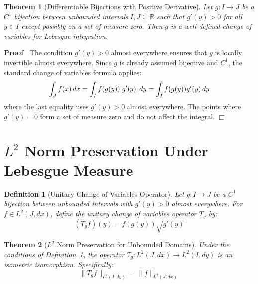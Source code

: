 \documentclass{article}
\newenvironment{proof}{\noindent\textbf{Proof\ }}{\hspace*{\fill}$\Box$\medskip}
\newtheorem{definition}{Definition}
\newtheorem{theorem}{Theorem}
\begin{document}
\begin{theorem}[Differentiable Bijections with Positive Derivative]
  \label{thm:diff_bijective}Let $g : I \to J$ be a $C^1$ bijection between
  unbounded intervals $I, J \subseteq \mathbb{R}$ such that $g' (y) > 0$ for
  all $y \in I$ except possibly on a set of measure zero. Then $g$ is a
  well-defined change of variables for Lebesgue integration.
\end{theorem}

\begin{proof}
  The condition $g' (y) > 0$ almost everywhere ensures that $g$ is locally
  invertible almost everywhere. Since $g$ is already assumed bijective and
  $C^1$, the standard change of variables formula applies:
  \begin{equation}
    \label{eq:change_vars} \int_J f (x)  \hspace{0.17em} dx = \int_I f (g (y))
    |g' (y) |  \hspace{0.17em} dy = \int_I f (g (y)) g' (y)  \hspace{0.17em}
    dy
  \end{equation}
  where the last equality uses $g' (y) > 0$ almost everywhere. The points
  where $g' (y) = 0$ form a set of measure zero and do not affect the
  integral.
\end{proof}

\section{$L^2$ Norm Preservation Under Lebesgue Measure}

\begin{definition}[Unitary Change of Variables Operator]
  \label{def:unitary_transform}Let $g : I \to J$ be a $C^1$ bijection between
  unbounded intervals with $g' (y) > 0$ almost everywhere. For $f \in L^2 (J,
  dx)$, define the unitary change of variables operator $T_g$ by:
  \begin{equation}
    \label{eq:unitary_transform} (T_g f) (y) = f (g (y)) \sqrt{g' (y)}
  \end{equation}
\end{definition}

\begin{theorem}[$L^2$ Norm Preservation for Unbounded Domains]
  \label{thm:l2_preservation}Under the conditions of
  Definition~\ref{def:unitary_transform}, the operator $T_g : L^2 (J, dx) \to
  L^2 (I, dy)$ is an isometric isomorphism. Specifically:
  \begin{equation}
    \label{eq:norm_equality} \|T_g f\|_{L^2 (I, dy)} = \|f\|_{L^2 (J, dx)}
  \end{equation}
\end{theorem}
\end{document}
